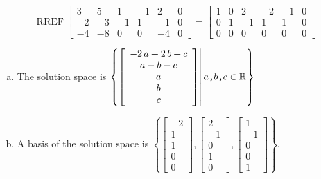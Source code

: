 \begin{exerciseAnswer} 


\[\operatorname{RREF} \left[\begin{array}{ccccc|c}
3 & 5 & 1 & -1 & 2 & 0 \\
-2 & -3 & -1 & 1 & -1 & 0 \\
-4 & -8 & 0 & 0 & -4 & 0
\end{array}\right] = \left[\begin{array}{ccccc|c}
1 & 0 & 2 & -2 & -1 & 0 \\
0 & 1 & -1 & 1 & 1 & 0 \\
0 & 0 & 0 & 0 & 0 & 0
\end{array}\right] \]


\begin{enumerate}[(a)]
\item The solution space is \( \left\{ \left[\begin{array}{c}
-2 \, a + 2 \, b + c \\
a - b - c \\
a \\
b \\
c
\end{array}\right] \middle|\,a\text{\texttt{,}}b\text{\texttt{,}}c\in\mathbb{R}\right\} \)
\item A basis of the solution space is \( \left\{ \left[\begin{array}{c}
-2 \\
1 \\
1 \\
0 \\
0
\end{array}\right] , \left[\begin{array}{c}
2 \\
-1 \\
0 \\
1 \\
0
\end{array}\right] , \left[\begin{array}{c}
1 \\
-1 \\
0 \\
0 \\
1
\end{array}\right] \right\} \).
\end{enumerate}
    
\end{exerciseAnswer}
    
